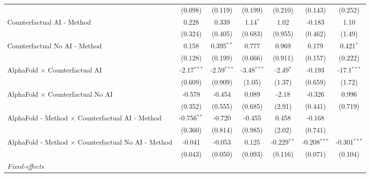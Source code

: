 \begin{tabular}{lcccccc}
                                                              & (0.098)       & (0.119)       & (0.199)       & (0.210)       & (0.143)        & (0.252)\\   
   Counterfactual AI - Method                                 & 0.228         & 0.339         & 1.14$^{*}$    & 1.02          & -0.183         & 1.10\\   
                                                              & (0.324)       & (0.405)       & (0.683)       & (0.955)       & (0.462)        & (1.49)\\   
   Counterfactual No AI - Method                              & 0.158         & 0.395$^{**}$  & 0.777         & 0.969         & 0.179          & 0.421$^{*}$\\   
                                                              & (0.128)       & (0.199)       & (0.666)       & (0.911)       & (0.157)        & (0.222)\\   
   AlphaFold $\times$ Counterfactual AI                       & -2.17$^{***}$ & -2.59$^{***}$ & -3.48$^{***}$ & -2.49$^{*}$   & -0.193         & -17.1$^{***}$\\   
                                                              & (0.609)       & (0.909)       & (1.05)        & (1.37)        & (0.659)        & (1.72)\\   
   AlphaFold $\times$ Counterfactual No AI                    & -0.578        & -0.454        & 0.089         & -2.18         & -0.326         & 0.996\\   
                                                              & (0.352)       & (0.555)       & (0.685)       & (2.91)        & (0.441)        & (0.719)\\   
   AlphaFold - Method $\times$ Counterfactual AI - Method     & -0.756$^{**}$ & -0.720        & -0.455        & 0.458         & -0.168         &   \\   
                                                              & (0.360)       & (0.814)       & (0.985)       & (2.02)        & (0.741)        &   \\   
   AlphaFold - Method $\times$ Counterfactual No AI - Method  & -0.041        & -0.053        & 0.125         & -0.229$^{**}$ & -0.208$^{***}$ & -0.301$^{***}$\\   
                                                              & (0.043)       & (0.050)       & (0.093)       & (0.116)       & (0.071)        & (0.104)\\   
   \midrule
   \emph{Fixed-effects}\\

\end{tabular}
